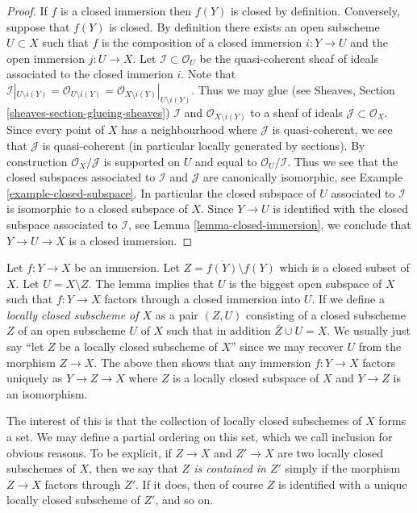 \begin{proof}
If $f$ is a closed immersion then $f(Y)$ is closed by definition.
Conversely, suppose that $f(Y)$ is closed. By definition
there exists an open subscheme $U \subset X$ such that $f$ is the composition
of a closed immersion $i : Y \to U$ and the open immersion
$j : U \to X$. Let $\mathcal{I} \subset \mathcal{O}_U$ be the
quasi-coherent sheaf of ideals associated to the closed immerion
$i$. Note that
$\mathcal{I}|_{U \setminus i(Y)}
= \mathcal{O}_{U \setminus i(Y)}
= \mathcal{O}_{X \setminus i(Y)}|_{U \setminus i(Y)}$.
Thus we may glue (see Sheaves, Section \ref{sheaves-section-glueing-sheaves})
$\mathcal{I}$ and $\mathcal{O}_{X \setminus i(Y)}$ to a sheaf of
ideals $\mathcal{J} \subset \mathcal{O}_X$. Since every
point of $X$ has a neighbourhood where $\mathcal{J}$ is
quasi-coherent, we see that $\mathcal{J}$ is quasi-coherent
(in particular locally generated by sections).
By construction $\mathcal{O}_X/\mathcal{J}$ is supported
on $U$ and equal to $\mathcal{O}_U/\mathcal{I}$.
Thus we see that the closed subspaces associated to $\mathcal{I}$
and $\mathcal{J}$ are canonically isomorphic, see
Example \ref{example-closed-subspace}.
In particular the closed subspace of $U$ associated to $\mathcal{I}$
is isomorphic to a closed subspace of $X$.
Since $Y \to U$ is identified with the closed subspace
associated to $\mathcal{I}$, see Lemma \ref{lemma-closed-immersion},
we conclude that $Y \to U \to X$
is a closed immersion.
\end{proof}

\noindent
Let $f : Y \to X$ be an immersion.
Let $Z = \overline{f(Y)} \setminus f(Y)$ which is a closed subset of $X$.
Let $U = X \setminus Z$.
The lemma implies that $U$ is the biggest open subspace of $X$
such that $f : Y \to X$ factors through a closed immersion into $U$.
If we define a {\it locally closed subscheme of $X$} as a pair
$(Z, U)$ consisting of a closed subscheme $Z$ of an open subscheme $U$
of $X$ such that in addition $\overline{Z} \cup U = X$. We usually
just say ``let $Z$ be a locally closed subscheme of $X$'' since we may
recover $U$ from the morphism $Z \to X$. The above
then shows that any immersion $f : Y \to X$ factors uniquely
as $Y \to Z \to X$ where $Z$ is a locally closed subspace of $X$
and $Y \to Z$ is an isomorphism.

\medskip\noindent
The interest of this is that the collection of locally closed subschemes
of $X$ forms a set. We may define a partial ordering on this set,
which we call inclusion for obvious reasons. To be explicit, if
$Z \to X$ and $Z' \to X$ are two locally closed subschemes of $X$, then
we say that {\it $Z$ is contained in $Z'$} simply if the morphism
$Z \to X$ factors through $Z'$. If it does, then of course $Z$ is identified
with a unique locally closed subscheme of $Z'$, and so on.












